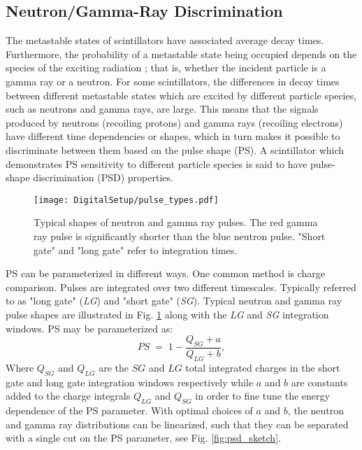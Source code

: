 \documentclass[main.tex]{subfiles}
\begin{document}
\subsection{Neutron/Gamma-Ray Discrimination}\label{sec:psd}
The metastable states of scintillators have associated average decay times. 
Furthermore, the probability of a metastable state being occupied depends on the species of the exciting radiation \cite{Krane}; that is, whether the incident particle is a gamma ray or a neutron. For some scintillators, the differences in decay times between different metastable states which are excited by different particle species, such as neutrons and gamma rays, are large. This means that the signals produced by neutrons (recoiling protons) and gamma rays (recoiling electrons) have different time dependencies or shapes, which in turn makes it possible to discriminate between them based on the pulse shape (PS). A scintillator which demonstrates PS sensitivity to different particle species is said to have pulse-shape discrimination (PSD) properties.
\begin{figure}[ht]
	\centering
    	\texttt{[image: DigitalSetup/pulse\_types.pdf]}
        \caption[Typical shapes of neutron and gamma ray pulses]{Typical shapes of neutron and gamma ray pulses. The red gamma ray pulse is significantly shorter than the blue neutron pulse. "Short gate" and "long gate" refer to integration times.}
	    \label{fig:pulse_types} 
\end{figure}

PS can be parameterized in different ways. One common method is charge comparison. Pulses are integrated over two different timescales. Typically referred to as "long gate" (\textit{LG}) and "short gate" (\textit{SG}). Typical neutron and gamma ray pulse shapes are illustrated in Fig. \ref{fig:pulse_types} along with the \textit{LG} and \textit{SG} integration windows. PS may be parameterized as:
\begin{equation}
	PS \; = \; 1-\frac{Q_{SG} + a}{Q_{LG} + b},
	\label{eq:ps}
\end{equation}
Where $Q_{SG}$ and $Q_{LG}$ are the $SG$ and $LG$ total integrated charges in the short gate and long gate integration windows respectively while $a$ and $b$ are constants added to the charge integrals $Q_{LG}$ and $Q_{SG}$ in order to fine tune the energy dependence of the PS parameter. 
With optimal choices of $a$ and $b$, the neutron and gamma ray distributions can be linearized, such that they can be separated with a single cut on the PS parameter, see Fig. \ref{fig:psd_sketch}.
\end{document}
